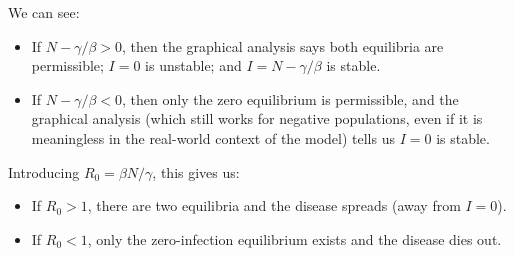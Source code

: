 \documentclass[a4paper,12pt]{article}
\begin{document}
\begin{enumerate}[label={\bf \arabic{*}.\;}, ref={\arabic{*}},itemsep=3ex, left=0ex]
{\begin{enumerate}[label=(\alph*)]
          \begin{center}%
            \scalebox{0.9}{}\quad
            \scalebox{0.9}{}
          \end{center}%

          We can see:
          \begin{itemize}
            \item If $N-\gamma/\beta > 0$, then the graphical analysis says both equilibria are permissible; $I=0$ is unstable; and $I=N-\gamma/\beta$ is stable.
            \item If $N-\gamma/\beta < 0$, then only the zero equilibrium is permissible, and the graphical analysis (which still works for negative populations, even if it is meaningless in the real-world context of the model) tells us $I=0$ is stable.
          \end{itemize}
          Introducing $R_0 = \beta N/\gamma$, this gives us:
          \begin{itemize}
            \item If $R_0 > 1$, there are two equilibria and the disease spreads (away from $I=0$).
            \item If $R_0 < 1$, only the zero-infection equilibrium exists and the disease dies out.
          \end{itemize}





\end{enumerate}}
\end{enumerate}
\end{document}
